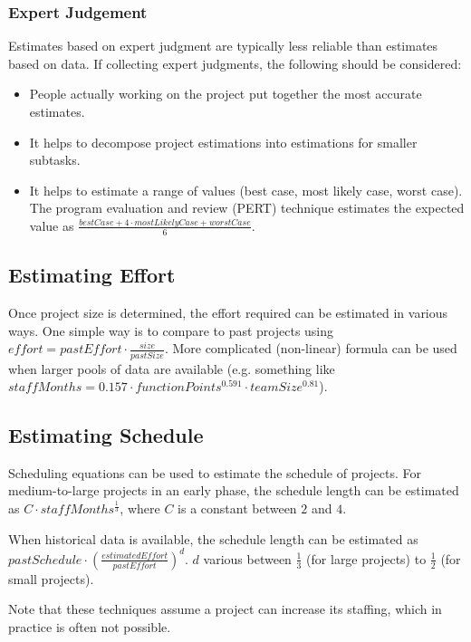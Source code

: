 \documentclass[12pt,titlepage]{article}
\begin{document}
      \subsubsection{Expert Judgement}
        Estimates based on expert judgment are typically less reliable than estimates based on data. If collecting expert judgments,
        the following should be considered:
        \begin{itemize}
          \item People actually working on the project put together the most accurate estimates.
          \item It helps to decompose project estimations into estimations for smaller subtasks.
          \item It helps to estimate a range of values (best case, most likely case, worst case). The program evaluation and review (PERT)
            technique estimates the expected value as $\frac{bestCase + 4 \cdot mostLikelyCase + worstCase}{6}$.
        \end{itemize}

    \subsection{Estimating Effort}
      Once project size is determined, the effort required can be estimated in various ways. One simple way is to compare to past projects using
      $effort = pastEffort \cdot \frac{size}{pastSize}$. More complicated (non-linear) formula can be used when larger pools of data are available
      (e.g. something like $staffMonths = 0.157 \cdot functionPoints^{0.591} \cdot teamSize^{0.81}$).

    \subsection{Estimating Schedule}
      Scheduling equations can be used to estimate the schedule of projects. For medium-to-large projects in an early phase, the schedule length
      can be estimated as $C \cdot staffMonths^{\frac{1}{3}}$, where $C$ is a constant between $2$ and $4$.

      When historical data is available, the schedule length can be estimated as $pastSchedule \cdot (\frac{estimatedEffort}{pastEffort})^d$.
      $d$ various between $\frac{1}{3}$ (for large projects) to $\frac{1}{2}$ (for small projects).

      Note that these techniques assume a project can increase its staffing, which in practice is often not possible.
\end{document}
